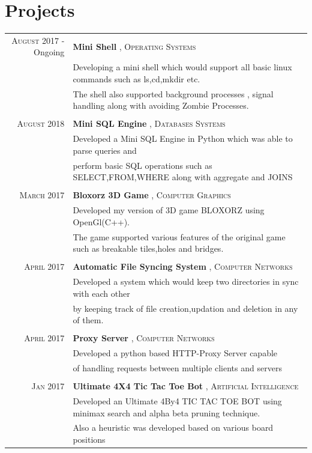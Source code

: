 \documentclass[a4paper,10pt]{article}
\begin{document}
\section{Projects}
\begin{tabular}{rl}	

\textsc{August} 2017 - Ongoing & \textbf{Mini Shell} , \textsc{Operating Systems}\\
& \footnotesize{Developing a mini shell which would support all basic linux commands such as ls,cd,mkdir etc.}\\
& \footnotesize{The shell also supported background processes , signal handling along with avoiding Zombie Processes.}\\\\




\textsc{August} 2018 & \textbf{Mini SQL Engine} , \textsc{Databases Systems}\\
& \footnotesize{Developed a Mini SQL Engine in Python which was able to parse queries and}\\
& \footnotesize{perform basic SQL operations such as SELECT,FROM,WHERE along with aggregate and JOINS}\\\\



\textsc{March} 2017 & \textbf{Bloxorz 3D Game} , \textsc{Computer Graphics}\\
& \footnotesize{Developed my version of 3D game BLOXORZ using OpenGl(C++).}\\
& \footnotesize{The game supported various features of the original game such as breakable tiles,holes and bridges.}\\\\

 \textsc{April} 2017 & \textbf{Automatic File Syncing System} , \textsc{Computer Networks}\\
& \footnotesize{Developed a system which would keep two directories in sync with each other}\\
& \footnotesize{by keeping track of file creation,updation and deletion in any of them.}\\\\


\textsc{April} 2017 & \textbf{Proxy Server} , \textsc{Computer Networks}\\
& \footnotesize{Developed a python based HTTP-Proxy Server capable}\\
& \footnotesize{ of handling requests between multiple clients and servers}\\\\


\textsc{Jan} 2017 & \textbf{Ultimate 4X4 Tic Tac Toe Bot} , \textsc{Artificial Intelligence}\\
& \footnotesize{Developed an Ultimate 4By4 TIC TAC TOE BOT using minimax search and alpha beta pruning technique.}\\
& \footnotesize{Also a heuristic was developed based on various board positions }\\



\end{tabular}
\end{document}
